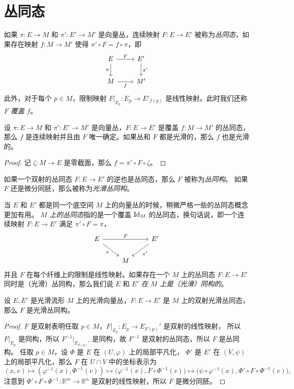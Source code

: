 \section{丛同态}

如果 $\pi:E\to M$ 和 $\pi':E'\to M'$ 是向量丛，连续映射 $F:E\to E'$
被称为\emph{丛同态}，如果存在映射 $f:M\to M'$ 使得
$\pi'\circ F=f\circ\pi$，即
\[
  \begin{tikzcd}
    E\arrow[r,"F"]\arrow[d,"\pi"'] & E'\arrow[d,"\pi'"]\\
    M\arrow[r,"f"'] & M' 
  \end{tikzcd}  
\]
此外，对于每个 $p\in M$，限制映射 $F|_{E_p}:E_p\to E'_{f(p)}$
是线性映射。此时我们还称 \emph{$F$ 覆盖 $f$}。

\begin{proposition}
  设 $\pi:E\to M$ 和 $\pi':E'\to M'$ 是向量丛，$F:E\to E'$
  是覆盖 $f:M\to M'$ 的丛同态，那么 $f$ 是连续映射并且由 $F$
  唯一确定。如果丛和 $F$ 都是光滑的，那么 $f$ 也是光滑的。
\end{proposition}
\begin{proof}
  记 $\zeta:M\to E$ 是零截面，那么 $f=\pi'\circ F\circ\zeta$。
\end{proof}

如果一个双射的丛同态 $F:E\to E'$ 的逆也是丛同态，那么 $F$ 被称为\emph{丛同构}。
如果 $F$ 还是微分同胚，那么被称为\emph{光滑丛同构}。

当 $E$ 和 $E'$ 都是同一个底空间 $M$ 上的向量丛的时候，稍微严格一些的丛同态概念更加有用。
\emph{$M$ 上的丛同态}指的是一个覆盖 $\operatorname{Id}_M$ 的丛同态，换句话说，即一个连续映射
$F:E\to E'$ 满足 $\pi'\circ F=\pi$，
\[
  \begin{tikzcd}
    E\arrow[rr,"F"]\arrow[dr,"\pi"'] & & E'\arrow[dl,"\pi'"]\\
    & M & 
  \end{tikzcd}  
\]
并且 $F$ 在每个纤维上的限制是线性映射。如果存在一个 $M$ 上的丛同态
$F:E\to E'$ 同时是（光滑）丛同构，那么我们说 $E$ 和 $E'$ 
\emph{在 $M$ 上是（光滑）同构的}。

\begin{proposition}
  设 $E,E'$ 是光滑流形 $M$ 上的光滑向量丛，$F:E\to E'$ 是
  $M$ 上的双射光滑丛同态，那么 $F$ 是光滑丛同构。
\end{proposition}
\begin{proof}
  $F$ 是双射表明任取 $p\in M$，$F|_{E_p}:E_p\to E_{F(p)}'$ 是双射的线性映射，
  所以 $F|_{E_p}$ 是同构，所以 $F^{-1}|_{E_{F(p)}'}$ 是同构，故
  $F^{-1}$ 是双射的丛同态，所以 $F$ 是丛同构。
  任取 $p\in M$，设 $\varPhi$ 是 $E$ 在 $(U,\varphi)$ 上的局部平凡化，
  $\varPhi'$ 是 $E'$ 在 $(V,\psi)$ 上的局部平凡化，那么 
  $F$ 在 $U\cap V$ 中的坐标表示为
  \[
    (x,v)\mapsto (\varphi^{-1}(x),\varPhi^{-1}(v))\mapsto \bigl(\varphi^{-1}(x),F\circ\varPhi^{-1}(v)\bigr)  
    \mapsto \bigl(\psi\circ\varphi^{-1}(x),\varPhi'\circ F\circ\varPhi^{-1}(v)\bigr),
  \]
  注意到 $\varPhi'\circ F\circ\varPhi^{-1}:\mathbb{R}^m\to \mathbb{R}^{n}$
  是双射的线性映射，所以 $F$ 是微分同胚。
\end{proof}

